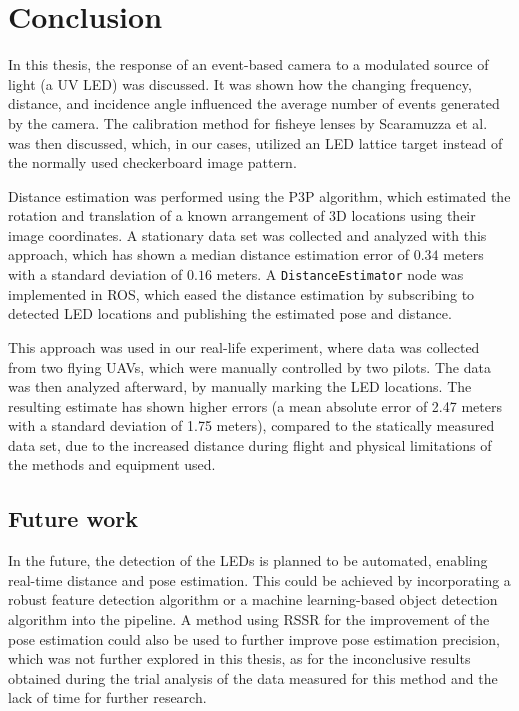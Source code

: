 
\chapter{Conclusion\label{chap:conclusion}}
In this thesis, the response of an event-based camera to a modulated source of light (a \ac{UV} \ac{LED}) was discussed.
It was shown how the changing frequency, distance, and incidence angle influenced the average number of events generated by the camera.
The calibration method for fisheye lenses by Scaramuzza et al.~\cite{scaramuzzacalibration} was then discussed, which, in our cases,
utilized an LED lattice target instead of the normally used checkerboard image pattern.

Distance estimation was performed using the \ac{P3P} algorithm, which estimated the rotation and translation of a known
arrangement of 3D locations using their image coordinates. A stationary data set was collected and analyzed with this
approach, which has shown a median distance estimation error of $0.34$ meters with a standard deviation of $0.16$ meters.
A \texttt{DistanceEstimator} node was implemented in \ac{ROS}, which eased the distance estimation by subscribing
to detected \ac{LED} locations and publishing the estimated pose and distance.

This approach was used in our real-life experiment, where data was collected from two flying \ac{UAV}s, which were manually controlled by two pilots.
The data was then analyzed afterward, by manually marking the \ac{LED} locations. The resulting estimate has shown
higher errors (a mean absolute error of 2.47 meters with a standard deviation of 1.75 meters), compared to the statically measured data set,
due to the increased distance during flight and physical limitations of the methods and equipment used.

\section{Future work}
In the future, the detection of the \ac{LED}s is planned to be automated, enabling real-time distance and pose estimation.
This could be achieved by incorporating a robust feature detection algorithm or a machine learning-based object detection
algorithm into the pipeline.
A method using \ac{RSSR} for the improvement of the pose estimation could also be used to further improve pose estimation precision,
which was not further explored in this thesis, as for the inconclusive results obtained during the trial analysis of the data measured for this method and the lack of time for further research.